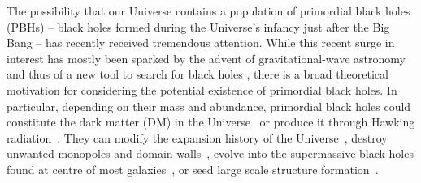 \documentclass[
onecolumn, %
11pt, %
tightenlines,
superscriptaddress, %
nofootinbib, %
preprintnumbers, %
prd %
]{revtex4-1}
\begin{document}
The possibility that our Universe contains a population of primordial black holes (PBHs) -- black holes formed during the Universe's infancy just after the Big Bang -- has recently received tremendous attention. While this recent surge in interest has mostly been sparked by the advent of gravitational-wave astronomy and thus of a new tool to search for black holes \cite{Abbott:2016blz}, there is a broad theoretical motivation for considering the potential existence of primordial black holes.  In particular, depending on their mass and abundance, primordial black holes could constitute the dark matter (DM) in the Universe~\cite{%
Carr:2016drx,                  %
Green:2020jor,                 %
Carr:2020xqk,                  %
Villanueva-Domingo:2021spv,    %
Katz:2018zrn}                  %
%
or produce it through Hawking radiation~\cite{
Green:1999yh,         %
Khlopov:2004tn,       %
Fujita:2014hha,
Allahverdi:2017sks,
Lennon:2017tqq,       %
Morrison:2018xla,     %
Hooper:2019gtx,       %
Masina:2020xhk,       %
Baldes:2020nuv,       %
Gondolo:2020uqv,      %
Bernal:2020kse,       %
Bernal:2020bjf,       %
Bernal:2020bjf}.      %
They can modify the expansion history of the Universe~\cite{%
Hooper:2019gtx,       %
Chaudhuri:2020wjo},   %
%
destroy unwanted monopoles and domain walls~\cite{
Stojkovic:2004hz,
Stojkovic:2005zh},
%
evolve into the supermassive black holes found at centre of most galaxies~\cite{
Bean:2002kx},
%
or seed large scale structure formation~\cite{Hoyle:1966,Ryan:1972,Carr:1984,Afshordi:2003zb,Carr:2020gox}.
\end{document}
